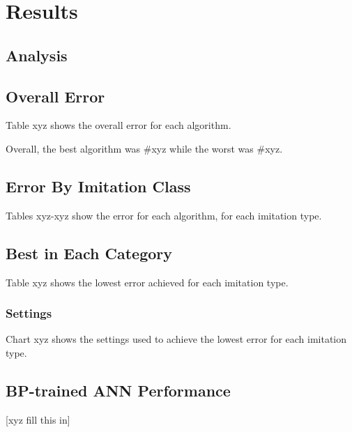 \section {Results}
\label{results}

\subsection {Analysis} 


\subsection{Overall Error}
Table xyz %
shows the overall error for each algorithm.

Overall, the best algorithm was \#xyz while the worst was \#xyz. 

\subsection{Error By Imitation Class}
Tables xyz-xyz %
show the error for each algorithm, for each imitation type.

\subsection{Best in Each Category}
Table xyz %
shows the lowest error achieved for each imitation type. 

\subsubsection{Settings}
Chart xyz %
shows the settings used to achieve the lowest error for each imitation type.

\subsection{BP-trained ANN Performance}
[xyz fill this in]

